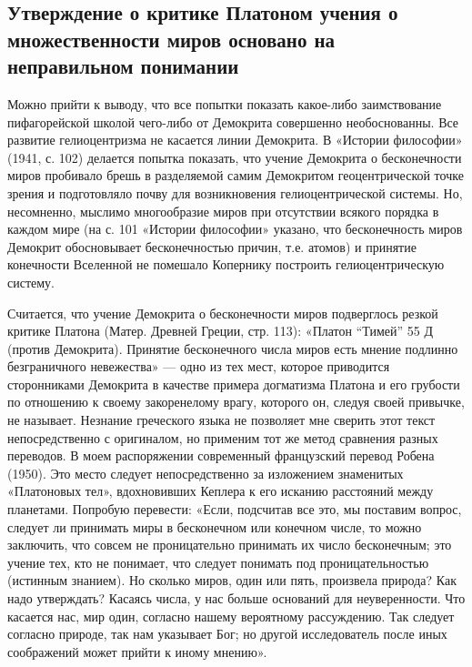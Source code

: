 \subsection{Утверждение о критике Платоном учения о множественности
миров основано на неправильном понимании}

Можно прийти к выводу, что все попытки показать какое-либо
заимствование пифагорейской школой чего-либо от Демокрита совершенно
необоснованны. Все развитие гелиоцентризма не касается линии Демокрита.
В «Истории философии» (1941, с. 102) делается попытка показать, что
учение Демокрита о бесконечности миров пробивало брешь в разделяемой
самим Демокритом геоцентрической точке зрения и подготовляло почву для
возникновения гелиоцентрической системы. Но, несомненно, мыслимо
многообразие миров при отсутствии всякого порядка в каждом мире (на с.
101 «Истории философии» указано, что бесконечность миров Демокрит
обосновывает бесконечностью причин, т.е. атомов) и принятие
конечности Вселенной не помешало Копернику построить гелиоцентрическую
систему.

Считается, что учение Демокрита о бесконечности миров подверглось
резкой критике Платона (Матер. Древней Греции, стр. 113): «Платон
``Тимей'' 55 Д (против Демокрита). Принятие бесконечного числа миров
есть мнение подлинно безграничного невежества» --- одно из тех мест,
которое приводится сторонниками Демокрита в качестве примера
догматизма Платона и его грубости по отношению к своему закоренелому
врагу, которого он, следуя своей привычке, не называет. Незнание
греческого языка не позволяет мне сверить этот текст непосредственно с
оригиналом, но применим тот же метод сравнения разных переводов. В
моем распоряжении современный французский перевод Робена (1950). Это
место следует непосредственно за изложением знаменитых «Платоновых
тел», вдохновивших Кеплера к его исканию расстояний между планетами.
Попробую перевести: «Если, подсчитав все это, мы поставим вопрос,
следует ли принимать миры в бесконечном или конечном числе, то можно
заключить, что совсем не проницательно принимать их число бесконечным;
это учение тех, кто не понимает, что следует понимать под
проницательностью (истинным знанием). Но сколько миров, один или пять,
произвела природа? Как надо утверждать? Касаясь числа, у нас больше
оснований для неуверенности. Что касается нас, мир один, согласно
нашему вероятному рассуждению. Так следует согласно природе, так нам
указывает Бог; но другой исследователь после иных соображений может
прийти к иному мнению».


